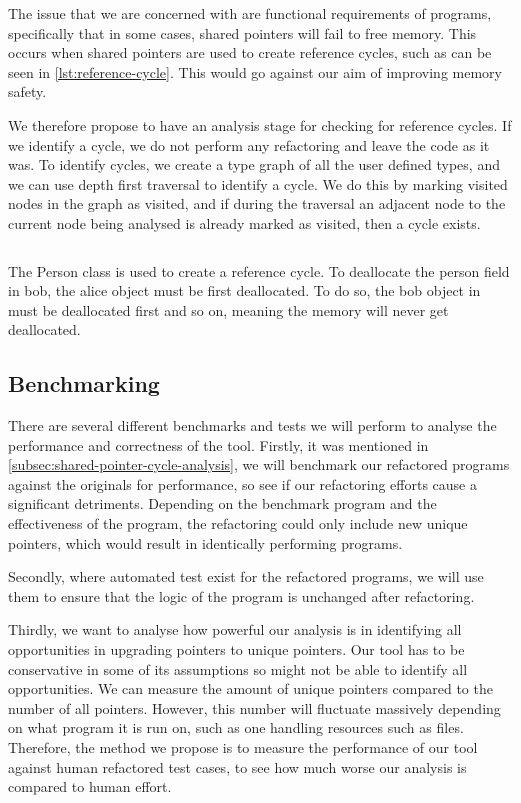 \documentclass{proposal}
\begin{document}
    The issue that we are concerned with are functional requirements of programs, specifically that in some cases, shared pointers will fail to free memory.
    This occurs when shared pointers are used to create reference cycles, such as can be seen in \autoref{lst:reference-cycle}.
    This would go against our aim of improving memory safety.

    We therefore propose to have an analysis stage for checking for reference cycles.
    If we identify a cycle, we do not perform any refactoring and leave the code as it was.
    To identify cycles, we create a type graph of all the user defined types, and we can use depth first traversal to identify a cycle.
    We do this by marking visited nodes in the graph as visited, and if during the traversal an adjacent node to the current node being analysed is already marked as visited, then a cycle exists.

    \begin{listing}
        \inputminted{c++}{code/reference-cycle.cpp}
        \caption{The Person class is used to create a reference cycle. To deallocate the person field in bob, the alice object must be first deallocated. To do so, the bob object in must be deallocated first and so on, meaning the memory will never get deallocated.}
        \label{lst:reference-cycle}
    \end{listing}

    \subsection{Benchmarking}\label{subsec:benchmarking}

    There are several different benchmarks and tests we will perform to analyse the performance and correctness of the tool.
    Firstly, it was mentioned in \autoref{subsec:shared-pointer-cycle-analysis}, we will benchmark our refactored programs against the originals for performance, so see if our refactoring efforts cause a significant detriments.
    Depending on the benchmark program and the effectiveness of the program, the refactoring could only include new unique pointers, which would result in identically performing programs.

    Secondly, where automated test exist for the refactored programs, we will use them to ensure that the logic of the program is unchanged after refactoring.

    Thirdly, we want to analyse how powerful our analysis is in identifying all opportunities in upgrading pointers to unique pointers.
    Our tool has to be conservative in some of its assumptions so might not be able to identify all opportunities.
    We can measure the amount of unique pointers compared to the number of all pointers.
    However, this number will fluctuate massively depending on what program it is run on, such as one handling resources such as files.
    Therefore, the method we propose is to measure the performance of our tool against human refactored test cases, to see how much worse our analysis is compared to human effort.
\end{document}
